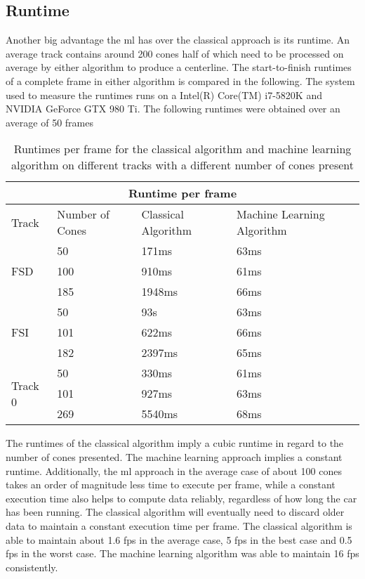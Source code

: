 \subsection{Runtime}
Another big advantage the \ac{ml} has over the classical approach is its runtime. An average track contains around 200 cones half of which need to be processed on average by either algorithm to produce a centerline. The start-to-finish runtimes of a complete frame in either algorithm is compared in the following. The system used to measure the runtimes runs on a Intel(R) Core(TM) i7-5820K and NVIDIA GeForce GTX 980 Ti. The following runtimes were obtained over an average of 50 frames

\begin{table}[h!]
\centering
\begin{tabular}{ |p{1.5cm} p{3cm}||p{4cm}|p{5cm}|  }
    \hline
    \multicolumn{4}{|c|}{Runtime per frame} \\
    \hline
    Track  & Number of Cones  & Classical Algorithm & Machine Learning Algorithm\\
    \hline
    \hline

    \multirow{3}{*}{FSD} & 50  & 171ms & 63ms \\
                         & 100 & 910ms & 61ms\\
                         & 185 & 1948ms & 66ms\\ 
                         \hline
    \multirow{3}{*}{FSI} & 50  & 93s & 63ms\\
                         & 101 & 622ms & 66ms\\
                         & 182 & 2397ms & 65ms\\ 
                         \hline
    \multirow{3}{*}{Track 0} & 50  & 330ms & 61ms\\
                             & 101 & 927ms & 63ms\\
                             & 269 & 5540ms & 68ms\\ 
                             \hline
   \end{tabular}
\caption{Runtimes per frame for the classical algorithm and machine learning algorithm on different tracks with a different number of cones present}
\label{table:2}
\end{table}

The runtimes of the classical algorithm imply a cubic runtime in regard to the number of cones presented. The machine learning approach implies a constant runtime. Additionally, the \ac{ml} approach in the average case of about 100 cones takes an order of magnitude less time to execute per frame, while a constant execution time also helps to compute data reliably, regardless of how long the car has been running. The classical algorithm will eventually need to discard older data to maintain a constant execution time per frame. The classical algorithm is able to maintain about 1.6 \ac{fps} in the average case, 5 \ac{fps} in the best case and 0.5 \ac{fps} in the worst case. The machine learning algorithm was able to maintain 16 \ac{fps} consistently. 